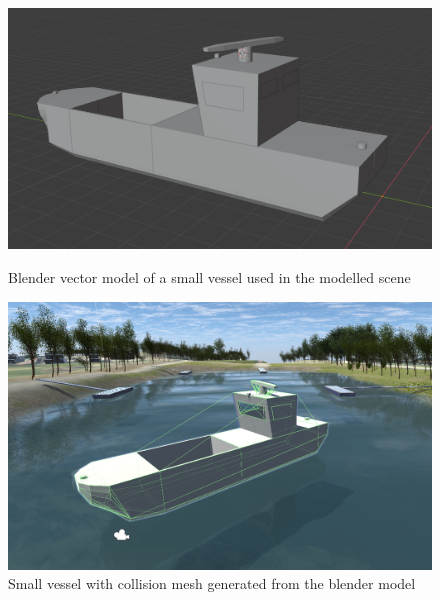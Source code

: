  	\begin{figure}[!htb]
 	\begin{minipage}[t]{0.48\textwidth}
 		\centering
 		\includegraphics[width=.99\linewidth]{Bilder/BlenderVessel.png}
 		\caption{Blender vector model of a small vessel used in the modelled scene}\label{fig_smallvessel}
 	\end{minipage}\hfill
 	\begin{minipage}[t]{0.48\textwidth}
 		\centering
 		\includegraphics[width=.99\linewidth]{Bilder/CollisionmeshVessel.png}
 		\caption{Small vessel with collision mesh generated from the blender model}\label{fig_collisionmesh}
 	\end{minipage}
 \end{figure}

